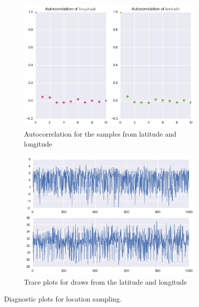 \documentclass{article} %
\begin{document}
\begin{figure}
  \centering
  \begin{subfigure}[b]{0.5\textwidth}
    \centering
    \includegraphics[width=\textwidth]{figures/autocorr-latlong}
    \caption{Autocorrelation for the samples from latitude and longitude}
    \label{fig:autocorr}
  \end{subfigure}
  \begin{subfigure}[b]{0.5\textwidth}
    \centering
    \includegraphics[width=\textwidth]{figures/trace-plots}
    \caption{Trace plots for draws from the latitude and longitude}
    \label{fig:trace}
  \end{subfigure}
  \caption{Diagnostic plots for location sampling.}
\end{figure}
\end{document}
